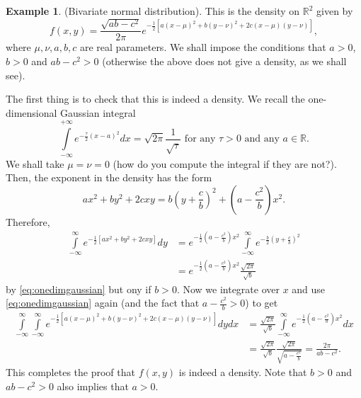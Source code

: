 \documentclass[preprint,  11pt]{amsart}
\theoremstyle{plain} %
\theoremstyle{definition} %
\newtheorem{example}[theorem]{Example}
\begin{document}
\begin{example} (Bivariate normal distribution). This is the density on $\mathbb{R}^{2}$ given by
$$
f(x,y)=\frac{\sqrt{ab-c^{2}}}{2\pi}e^{-\frac{1}{2}\left[a(x-\mu)^{2}+b(y-\nu)^{2}+2c(x-\mu)(y-\nu) \right]},
$$
where $\mu,\nu,a,b,c$ are real parameters. We shall impose the conditions that $a>0$, $b>0$ and $ab-c^{2}>0$ (otherwise the above does not give a density, as we shall see).

The first thing is to check that this is indeed a density. We recall the one-dimensional Gaussian integral 
\begin{equation}\label{eq:onedimgaussian}
\int\limits_{-\infty}^{+\infty}e^{-\frac{\tau}{2}(x-a)^{2}}dx = \sqrt{2\pi}\frac{1}{\sqrt{\tau}} \mbox{ for any }\tau>0 \mbox{ and any }a\in \mathbb{R}.
\end{equation}
We shall take $\mu=\nu=0$ (how do you compute the integral  if they are not?). Then, the exponent in the density has the form
$$
ax^{2}+by^{2}+2cxy = b\left(y+\frac{c}{b}\right)^{2}+\left(a-\frac{c^{2}}{b}\right)x^{2}.
$$
Therefore, 
\begin{align*}
\int\limits_{-\infty}^{\infty}e^{-\frac{1}{2}\left[ax^{2}+by^{2}+2cxy \right]} dy &= e^{-\frac{1}{2}(a-\frac{c^{2}}{b})x^{2}} \int\limits_{-\infty}^{\infty}e^{-\frac{b}{2}(y+\frac{c}{b})^{2}} \\
&= e^{-\frac{1}{2}(a-\frac{c^{2}}{b})x^{2}}\frac{\sqrt{2\pi}}{\sqrt{b}}
\end{align*}
by \eqref{eq:onedimgaussian} but ony if $b>0$. Now we integrate over $x$ and use \eqref{eq:onedimgaussian} again (and the fact that $a-\frac{c^{2}}{b}>0$) to get
\begin{align*}
\int\limits_{-\infty}^{\infty}\int\limits_{-\infty}^{\infty}e^{-\frac{1}{2}\left[a(x-\mu)^{2}+b(y-\nu)^{2}+2c(x-\mu)(y-\nu) \right]}dydx &= \frac{\sqrt{2\pi}}{\sqrt{b}} \int\limits_{-\infty}^{\infty} e^{-\frac{1}{2}(a-\frac{c^{2}}{b})x^{2}}dx \\
&= \frac{\sqrt{2\pi}}{\sqrt{b}} \frac{\sqrt{2\pi}}{\sqrt{a-\frac{c^{2}}{b}}} = \frac{2\pi}{ab-c^{2}}.
\end{align*}
This completes the proof that $f(x,y)$ is indeed a density. Note that $b>0$ and $ab-c^{2}>0$ also implies that $a>0$.
\end{example}
\end{document}
